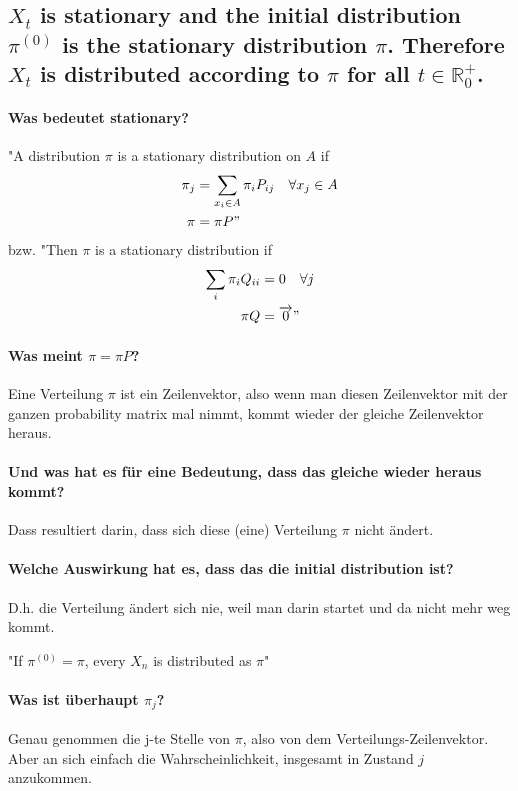 \subsection{$X_t$ is stationary and the initial distribution $\pi^{(0)}$ is the stationary distribution $\pi$. Therefore $X_t$ is distributed according to $\pi$ for all $t \in \mathbb{R}^+_0$.}
\paragraph{Was bedeutet stationary?}
"A distribution $\pi$ is a stationary distribution on $A$ if 
\begin{align*}
 \pi_j &= \sum_{x_i\in A} \pi_i P_{ij} \quad \forall x_j \in A \\
 \pi &= \pi P"
\end{align*}
bzw. "Then $\pi$ is a stationary distribution if
\begin{align*}
    \sum_i \pi_i Q_{ii}  &= 0 \quad \forall j \\
    \pi Q &= \overrightarrow{0}"
\end{align*}
\paragraph{Was meint $\pi = \pi P$?}
Eine Verteilung $\pi$ ist ein Zeilenvektor, also wenn man diesen Zeilenvektor mit der ganzen probability  matrix mal nimmt, kommt wieder der gleiche Zeilenvektor heraus. 
\paragraph{Und was hat es für eine Bedeutung, dass das gleiche wieder heraus kommt?}
Dass resultiert darin, dass sich diese (eine) Verteilung $\pi$ nicht ändert. 
\paragraph{Welche Auswirkung hat es, dass das die initial distribution ist?}
D.h. die Verteilung ändert sich nie, weil man darin startet und da nicht mehr weg kommt. 
 
"If $\pi^{(0)} = \pi$, every $X_n$ is distributed as $\pi$"
\paragraph{Was ist überhaupt $\pi_j$?} Genau genommen die j-te Stelle von $\pi$, also von dem Verteilungs-Zeilenvektor. Aber an sich einfach die Wahrscheinlichkeit, insgesamt in Zustand $j$ anzukommen. 
